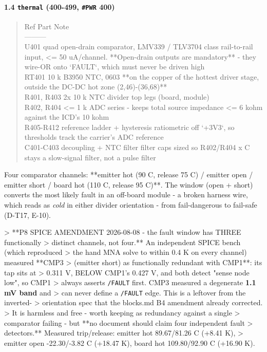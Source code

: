 \documentclass[11pt,a4paper]{article}
\begin{document}
\paragraph*{1.4 \texttt{thermal} (400-499, \texttt{\#PWR} 400)}
\begin{quote}\small\ttfamily\raggedright
\textbar{} Ref \textbar{} Part \textbar{} Note \textbar{}\\
\textbar{}---\textbar{}---\textbar{}---\textbar{}\\
\textbar{} U401 \textbar{} quad open-drain comparator, LMV339 / TLV3704 class \textbar{} rail-to-rail input, \textless{}= 50 uA/channel. {*}{*}Open-drain outputs are mandatory{*}{*} - they wire-OR onto `FAULT`, which must never be driven high \textbar{}\\
\textbar{} RT401 \textbar{} 10 k B3950 NTC, 0603 \textbar{} {*}{*}on the copper of the hottest driver stage, outside the DC-DC hot zone (2,46)-(36,68){*}{*} \textbar{}\\
\textbar{} R401, R403 \textbar{} 2x 10 k \textbar{} NTC divider top legs (board, module) \textbar{}\\
\textbar{} R402, R404 \textbar{} \textless{}= 1 k \textbar{} ADC series - keeps total source impedance \textless{}= 6 kohm against the ICD's 10 kohm \textbar{}\\
\textbar{} R405-R412 \textbar{} reference ladder + hysteresis \textbar{} ratiometric off `+3V3`, so thresholds track the carrier's ADC reference \textbar{}\\
\textbar{} C401-C403 \textbar{} decoupling + NTC filter \textbar{} filter caps sized so R402/R404 x C stays a slow-signal filter, not a pulse filter \textbar{}
\end{quote}
Four comparator channels: {*}{*}emitter hot (90 C, release 75 C) / emitter open / emitter short / board hot (110 C, release 95 C){*}{*}. The window (open + short) converts the most likely fault in an off-board module - a broken harness wire, which reads as \emph{cold} in either divider orientation - from fail-dangerous to fail-safe (D-T17, E-10).

\textgreater{} {*}{*}P8 SPICE AMENDMENT 2026-08-08 - the fault window has THREE functionally \textgreater{} distinct channels, not four.{*}{*} An independent SPICE bench (which reproduced \textgreater{} the hand MNA solve to within 0.4 K on every channel) measured {*}{*}CMP3 \textgreater{} (emitter short) as functionally redundant with CMP1{*}{*}: its tap sits at \textgreater{} 0.311 V, BELOW CMP1's 0.427 V, and both detect "sense node low", so CMP1 \textgreater{} always asserts \texttt{/FAULT} first. CMP3 measured a degenerate \textbf{1.1 mV band} and \textgreater{} can never define a \texttt{/FAULT} edge. This is a leftover from the inverted- \textgreater{} orientation spec that the blocks.md B4 amendment already corrected. \textgreater{} It is harmless and free - worth keeping as redundancy against a single \textgreater{} comparator failing - but {*}{*}no document should claim four independent fault \textgreater{} detectors.{*}{*} Measured trip/release: emitter hot 89.67/81.26 C (+8.41 K), \textgreater{} emitter open -22.30/-3.82 C (+18.47 K), board hot 109.80/92.90 C (+16.90 K).
\end{document}

